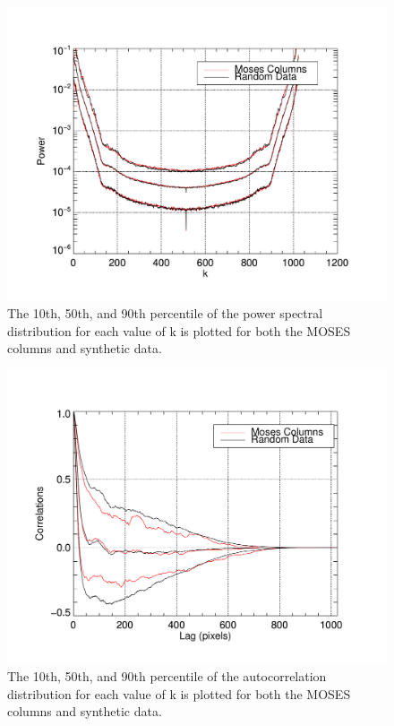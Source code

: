 \documentclass[]{solarphysics}
\begin{document}
\begin{article}
	\begin{figure}
		\centering
		\includegraphics[width=\linewidth]{images/sigtestpower}
		\caption{The 10th, 50th, and 90th percentile of the power spectral distribution for each value of k is plotted for both the MOSES columns and synthetic data.}
		\label{fig:sigtestpower}
	\end{figure}
	\begin{figure}
		\centering
		\includegraphics[width=\linewidth]{images/sigtestauto}
		\caption{The 10th, 50th, and 90th percentile of the autocorrelation distribution for each value of k is plotted for both the MOSES columns and synthetic data.}
		\label{fig:sigtestauto}
	\end{figure}
	

\end{article}
\end{document}
